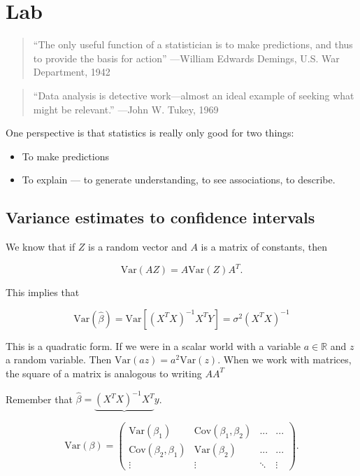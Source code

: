 \documentclass[
  letterpaper,
  DIV=11,
  numbers=noendperiod]{scrreport}
\providecommand{\tightlist}{%
  \setlength{\itemsep}{0pt}\setlength{\parskip}{0pt}}\usepackage{longtable,booktabs,array}
\begin{document}

\hypertarget{lab-1}{%
\chapter{Lab}\label{lab-1}}

\begin{quote}
``The only useful function of a statistician is to make predictions, and
thus to provide the basis for action'' ---William Edwards Demings, U.S.
War Department, 1942
\end{quote}

\begin{quote}
``Data analysis is detective work---almost an ideal example of seeking
what might be relevant.'' ---John W. Tukey, 1969
\end{quote}

One perspective is that statistics is really only good for two things:

\begin{itemize}
\tightlist
\item
  To make predictions
\item
  To explain --- to generate understanding, to see associations, to
  describe.
\end{itemize}

\hypertarget{variance-estimates-to-confidence-intervals}{%
\section{Variance estimates to confidence
intervals}\label{variance-estimates-to-confidence-intervals}}

We know that if \(Z\) is a random vector and \(A\) is a matrix of
constants, then

\[\text{Var}(AZ) = A \text{Var}(Z) A^T.\]

This implies that

\[\text{Var}(\hat \beta) = \text{Var}[(X^TX)^{-1} X^TY] = \sigma^2 (X^TX)^{-1}\]

This is a quadratic form. If we were in a scalar world with a variable
\(a \in \mathbb R\) and \(z\) a random variable. Then
\(\text{Var}(az) = a^2 \text{Var}(z)\). When we work with matrices, the
square of a matrix is analogous to writing \(AA^T\)

Remember that \(\hat \beta = \underbrace{(X^TX)^{-1} X^T}y\).

\[\text{Var}(\beta) = \left( \begin{array}{cccc}
\text{Var}(\beta_1) & \text{Cov}(\beta_1,\beta_2) & ... & ... \\
\text{Cov}(\beta_2, \beta_1) & \text{Var}(\beta_2) & ... & ... \\
\vdots & \vdots & \ddots & \vdots 
\end{array}\right).\]
\end{document}

